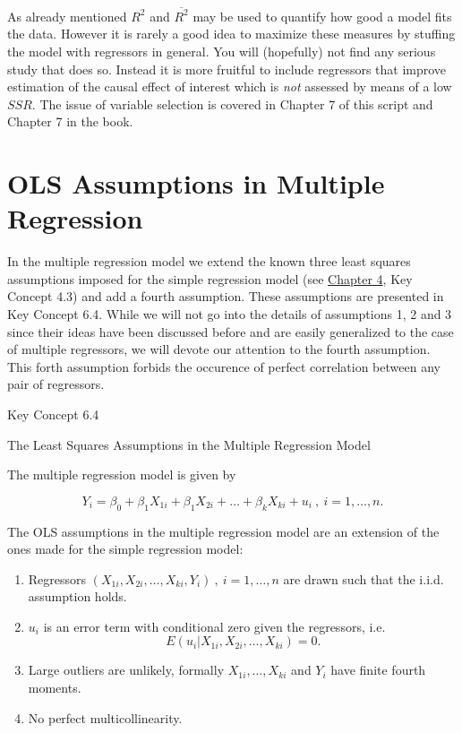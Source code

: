 \documentclass[]{book}
\providecommand{\tightlist}{%
  \setlength{\itemsep}{0pt}\setlength{\parskip}{0pt}}
\theoremstyle{definition}
\theoremstyle{definition}
\theoremstyle{definition}
\theoremstyle{remark}
\begin{document}
 As already mentioned \(R^2\) and \(\overline{R^2}\) may be used to
quantify how good a model fits the data. However it is rarely a good
idea to maximize these measures by stuffing the model with regressors in
general. You will (hopefully) not find any serious study that does so.
Instead it is more fruitful to include regressors that improve
estimation of the causal effect of interest which is \emph{not} assessed
by means of a low \(SSR\). The issue of variable selection is covered in
Chapter 7 of this script and Chapter 7 in the book.

\section{OLS Assumptions in Multiple
Regression}\label{ols-assumptions-in-multiple-regression}

In the multiple regression model we extend the known three least squares
assumptions imposed for the simple regression model (see
\protect\hyperlink{ch4}{Chapter 4}, Key Concept 4.3) and add a fourth
assumption. These assumptions are presented in Key Concept 6.4. While we
will not go into the details of assumptions 1, 2 and 3 since their ideas
have been discussed before and are easily generalized to the case of
multiple regressors, we will devote our attention to the fourth
assumption. This forth assumption forbids the occurence of perfect
correlation between any pair of regressors.

Key Concept 6.4

The Least Squares Assumptions in the Multiple Regression Model

The multiple regression model is given by

\[ Y_i = \beta_0 + \beta_1 X_{1i} + \beta_1 X_{2i} + \dots + \beta_k X_{ki} + u_i \ , \ i=1,\dots,n. \]

The OLS assumptions in the multiple regression model are an extension of
the ones made for the simple regression model:

\begin{enumerate}
\def\labelenumi{\arabic{enumi}.}
\tightlist
\item
  Regressors \((X_{1i}, X_{2i}, \dots, X_{ki}, Y_i) \ , \ i=1,\dots,n\)
  are drawn such that the i.i.d. assumption holds.
\item
  \(u_i\) is an error term with conditional zero given the regressors,
  i.e. \[ E(u_i\vert X_{1i}, X_{2i}, \dots, X_{ki}) = 0. \]
\item
  Large outliers are unlikely, formally \(X_{1i},\dots,X_{ki}\) and
  \(Y_i\) have finite fourth moments.
\item
  No perfect multicollinearity.
\end{enumerate}
\end{document}
